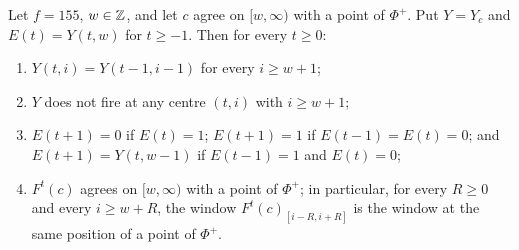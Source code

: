 \begin{proposition}\label{cl:prop:155W}
Let $f=155$, $w\in\mathbb{Z}$, and let $c$ agree on $[w,\infty)$ with a point of $\Phi^+$. Put $Y=Y_c$ and $E(t)=Y(t,w)$ for $t\ge-1$. Then for every $t\ge0$:
\begin{enumerate}
\item[(a)] $Y(t,i)=Y(t-1,i-1)$ for every $i\ge w+1$;
\item[(b)] $Y$ does not fire at any centre $(t,i)$ with $i\ge w+1$;
\item[(c)] $E(t+1)=0$ if $E(t)=1$; $E(t+1)=1$ if $E(t-1)=E(t)=0$; and $E(t+1)=Y(t,w-1)$ if $E(t-1)=1$ and $E(t)=0$;
\item[(d)] $F^t(c)$ agrees on $[w,\infty)$ with a point of $\Phi^+$; in particular, for every $R\ge0$ and every $i\ge w+R$, the window $F^t(c)_{[i-R,i+R]}$ is the window at the same position of a point of $\Phi^+$.
\end{enumerate}
\end{proposition}

